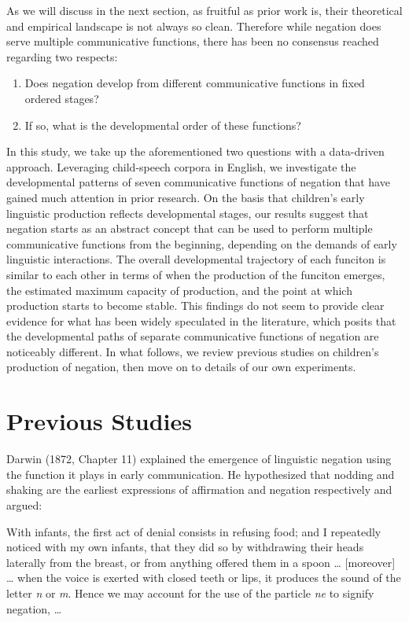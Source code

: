 \documentclass[
  english,
  man,floatsintext]{apa6}
\begin{document}
As we will discuss in the next section, as fruitful as prior work is, their theoretical and empirical landscape is not always so clean. Therefore while negation does serve multiple communicative functions, there has been no consensus reached regarding two respects:

\begin{enumerate}
\def\labelenumi{(\arabic{enumi})}
\item
  Does negation develop from different communicative functions in fixed ordered stages?
\item
  If so, what is the developmental order of these functions?
\end{enumerate}

In this study, we take up the aforementioned two questions with a data-driven approach. Leveraging child-speech corpora in English, we investigate the developmental patterns of seven communicative functions of negation that have gained much attention in prior research. On the basis that children's early linguistic production reflects developmental stages, our results suggest that negation starts as an abstract concept that can be used to perform multiple communicative functions from the beginning, depending on the demands of early linguistic interactions. The overall developmental trajectory of each funciton is similar to each other in terms of when the production of the funciton emerges, the estimated maximum capacity of production, and the point at which production starts to become stable. This findings do not seem to provide clear evidence for what has been widely speculated in the literature, which posits that the developmental paths of separate communicative functions of negation are noticeably different. In what follows, we review previous studies on children's production of negation, then move on to details of our own experiments.

\hypertarget{previous-studies}{%
\section{Previous Studies}\label{previous-studies}}

Darwin (1872, Chapter 11) explained the emergence of linguistic negation using the function it plays in early communication. He hypothesized that nodding and shaking are the earliest expressions of affirmation and negation respectively and argued:

With infants, the first act of denial consists in refusing food; and I repeatedly noticed with my own infants, that they did so by withdrawing their heads laterally from the breast, or from anything offered them in a spoon \ldots{} {[}moreover{]} \ldots{} when the voice is exerted with closed teeth or lips, it produces the sound of the letter \emph{n} or \emph{m}. Hence we may account for the use of the particle \emph{ne} to signify negation, \ldots{}
\end{document}
